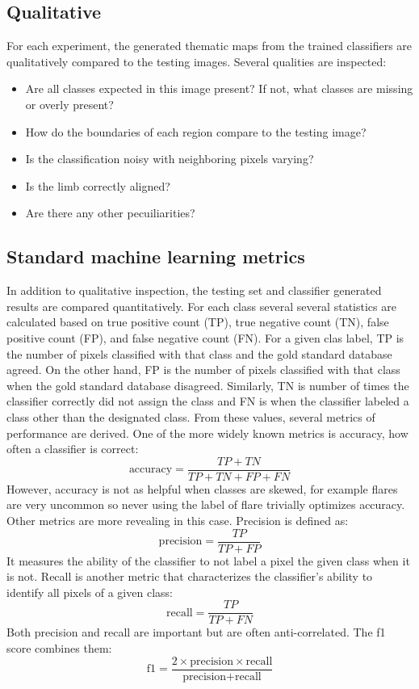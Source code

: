 \documentclass[twoside]{report}
\begin{document}
\subsection{Qualitative}
For each experiment, the generated thematic maps from the trained classifiers are qualitatively compared to the testing images. Several qualities are inspected:
\begin{itemize}
\item Are all classes expected in this image present? If not, what classes are missing or overly present?
\item How do the boundaries of each region compare to the testing image? 
\item Is the classification noisy with neighboring pixels varying? 
\item Is the limb correctly aligned? 
\item Are there any other pecuiliarities? 
\end{itemize}

\subsection{Standard machine learning metrics}
In addition to qualitative inspection, the testing set and classifier generated results are compared quantitatively. For each class several several statistics are calculated based on true positive count (TP), true negative count (TN), false positive count (FP), and false negative count (FN). For a given clas label, TP is the number of pixels classified with that class and the gold standard database agreed. On the other hand, FP is the number of pixels classified with that class when the gold standard database disagreed. Similarly, TN is number of times the classifier correctly did not assign the class and FN is when the classifier labeled a class other than the designated class. From these values, several metrics of performance are derived. One of the more widely known metrics is accuracy, how often a classifier is correct:
\[\text{accuracy} = \frac{TP + TN}{TP + TN + FP + FN}\] However, accuracy is not as helpful when classes are skewed, for example flares are very uncommon so never using the label of flare trivially optimizes accuracy. Other metrics are more revealing in this case. Precision is defined as:
\[ \text{precision} = \frac{TP}{TP + FP} \]
It measures the ability of the classifier to not label a pixel the given class when it is not. Recall is another metric that characterizes the classifier's ability to identify all pixels of a given class:
\[\text{recall} = \frac{TP}{TP + FN}\]
Both precision and recall are important but are often anti-correlated. The f1 score combines them:
\[\text{f1} = \frac{2 \times \text{precision} \times \text{recall}}{\text{precision} + \text{recall}}\]
\end{document}
